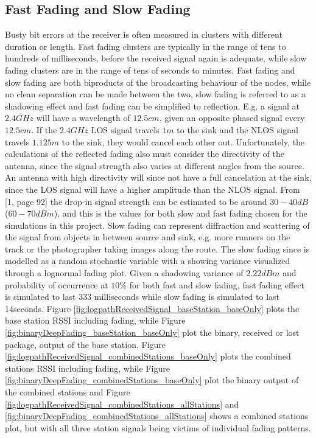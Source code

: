 \subsection{Fast Fading and Slow Fading}%
Busty bit errors at the receiver is often measured in clusters with different duration or length. Fast fading clusters are typically in the range of tens to hundreds of milliseconds, before the received signal again is adequate, while slow fading clusters are in the range of tens of seconds to minutes. Fast fading and slow fading are both biproducts of the broadcasting behaviour of the nodes, while no clean separation can be made between the two, slow fading is referred to as a shadowing effect and fast fading can be simplified to reflection. E.g. a signal at $2.4GHz$ will have a wavelength of $12.5cm$, given an opposite phased signal every $12.5cm$. If the $2.4GHz$ LOS signal travels $1m$ to the sink and the NLOS signal travels $1.125m$ to the sink, they would cancel each other out. Unfortunately, the calculations of the reflected fading also must consider the directivity of the antenna, since the signal strength also varies at different angles from the source. An antenna with high directivity will since not have a full cancelation at the sink, since the LOS signal will have a higher amplitude than the NLOS signal. From [1, page 92] the drop-in signal strength can be estimated to be around $30-40dB$ ($60-70dBm$), and this is the values for both slow and fast fading chosen for the simulations in this project. Slow fading can represent diffraction and scattering of the signal from objects in between source and sink, e.g. more runners on the track or the photographer taking images along the route. The slow fading since is modelled as a random stochastic variable with a showing variance visualized through a lognormal fading plot. Given a shadowing variance of $2.22dBm$ and probability of occurrence at $10\%$ for both fast and slow fading, fast fading effect is simulated to last 333 milliseconds while slow fading is simulated to last 14seconds. Figure \ref{fig:logpathReceivedSignal_baseStation_baseOnly} plots the base station RSSI including fading, while Figure \ref{fig:binaryDeepFading_baseStation_baseOnly} plot the binary, received or lost package, output of the base station. Figure \ref{fig:logpathReceivedSignal_combinedStations_baseOnly} plots the combined stations RSSI including fading, while Figure \ref{fig:binaryDeepFading_combinedStations_baseOnly} plot the binary output of the combined stations and Figure \ref{fig:logpathReceivedSignal_combinedStations_allStations} and \ref{fig:binaryDeepFading_combinedStations_allStations} shows a combined stations plot, but with all three station signals being victims of individual fading patterns. 
\clearpage

